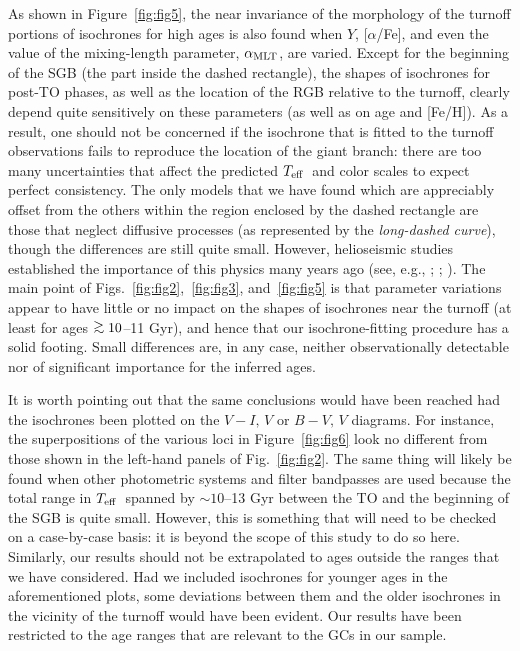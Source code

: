 \documentclass[12pt,preprint]{aastex}
\newcommand\teff{{T_{\rm eff}}}
\newcommand\amlt{{\alpha_{\rm MLT}}}
\newcommand\gta{\mathrel{\hbox{\raise 0.6 ex \hbox{$>$}\kern
                   -1.7 ex\lower .5 ex\hbox{$\sim$}}}}
\begin{document}
As shown in Figure~\ref{fig:fig5}, the near invariance of the morphology of the
turnoff portions of isochrones for high ages is also found when $Y$,
[$\alpha$/Fe], and even the value of the mixing-length parameter, $\amlt$,
are varied.  Except for the beginning of the SGB (the part inside the dashed
rectangle), the shapes of isochrones for post-TO phases, as well as the
location of the RGB relative to the turnoff, clearly depend quite sensitively
on these parameters (as well as on age and [Fe/H]).  As a result, one should
not be concerned if the isochrone that is fitted to the turnoff observations
fails to reproduce the location of the giant branch: there are too many 
uncertainties that affect the predicted $\teff$\ and color scales to
expect perfect consistency.  The only models that we have found which are
appreciably offset from the others within the region enclosed by the dashed
rectangle are those that neglect diffusive processes (as represented by the
{\it long-dashed curve}), though the differences are still quite small.
However, helioseismic studies established the importance of this physics many
years ago (see, e.g., \citealt{cpt93}; \citealt{bpb97}; \citealt{trm98}).
The main point of
Figs.~\ref{fig:fig2},~\ref{fig:fig3}, and~\ref{fig:fig5} is that 
parameter variations appear to have little or no impact on the shapes of
isochrones near the turnoff (at least for ages $\gta 10$--11 Gyr), and hence
that our isochrone-fitting procedure has a solid footing.  Small differences
are, in any case, neither observationally detectable nor of significant
importance for the inferred ages.

It is worth pointing out that the same 
conclusions would have been reached had the isochrones been plotted on the
$V-I,\,V$ or $B-V,\,V$ diagrams.  For instance, the superpositions of the
various loci in Figure~\ref{fig:fig6} look no different from those shown in the
left-hand panels of Fig.~\ref{fig:fig2}.  The same thing will likely be found
when other photometric systems and filter bandpasses are used because the total
range in $\teff$\ spanned by $\sim 10$--13 Gyr between the TO and the beginning
of the SGB is quite small.  However, this is something that will need to be
checked on a case-by-case basis: it is beyond the scope of this study to do so
here.  Similarly, our results should not be extrapolated to ages outside the
ranges that we have considered.  Had we included isochrones for younger ages in
the aforementioned plots, some deviations between them and the older isochrones
in the vicinity of the turnoff would have been evident.  Our results have been
restricted to the age ranges that are relevant to the GCs in our sample.
\end{document}
